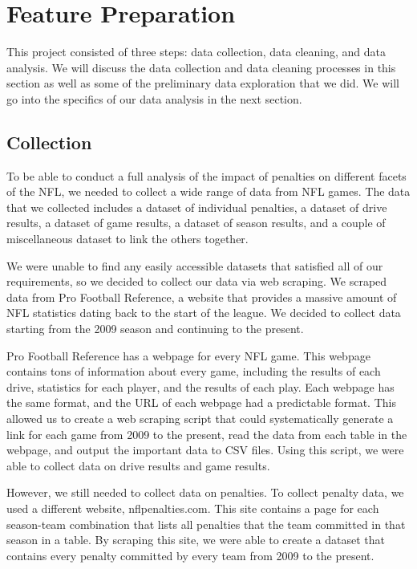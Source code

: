 \documentclass[sigconf, nonacm]{acmart}
\begin{document}
\section{Feature Preparation}

This project consisted of three steps: data collection, data cleaning, and data
analysis. We will discuss the data collection and data cleaning processes in
this section as well as some of the preliminary data exploration that we did.
We will go into the specifics of our data analysis in the next section.

\subsection{Collection}

To be able to conduct a full analysis of the impact of penalties on different
facets of the NFL, we needed to collect a wide range of data from NFL games.
The data that we collected includes a dataset of individual penalties, a dataset
of drive results, a dataset of game results, a dataset of season results, and a
couple of miscellaneous dataset to link the others together.

We were unable to find any easily accessible datasets that satisfied all of our
requirements, so we decided to collect our data via web scraping. We scraped
data from Pro Football Reference, a website that provides a massive amount of
NFL statistics dating back to the start of the league. We decided to collect
data starting from the 2009 season and continuing to the present.

Pro Football Reference has a webpage for every NFL game. This webpage contains
tons of information about every game, including the results of each drive,
statistics for each player, and the results of each play. Each webpage has the
same format, and the URL of each webpage had a predictable format. This allowed
us to create a web scraping script that could systematically generate a link for
each game from 2009 to the present, read the data from each table in the
webpage, and output the important data to CSV files. Using this script, we were
able to collect data on drive results and game results.

However, we still needed to collect data on penalties. To collect penalty data,
we used a different website, nflpenalties.com. This site contains a page for
each season-team combination that lists all penalties that the team committed in
that season in a table. By scraping this site, we were able to create a dataset
that contains every penalty committed by every team from 2009 to the present.
\end{document}
